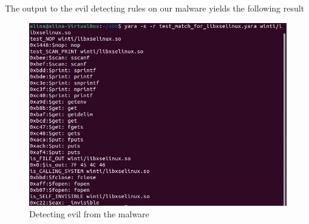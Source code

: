 The output to the evil detecting rules on our malware yields the following result \\

\begin{figure}[!h]

    \centering
    \includegraphics[width=\textwidth]{pt.jpeg}
    \caption{Detecting evil from the malware}
    \label{fig:file_evil}
    
\end{figure}